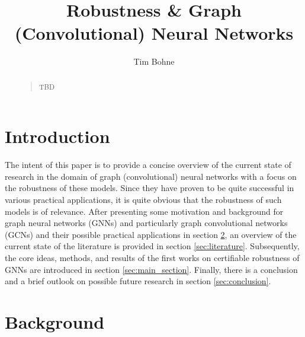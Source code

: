 \documentclass[a4paper,preprint]{sig-alternate}
\begin{document}
\title{Robustness \& Graph (Convolutional) Neural Networks}

%
\author{
%
\alignauthor Tim Bohne\\
}

\maketitle


\begin{abstract}
\begin{quote}
TBD
\end{quote}
\end{abstract}

\section{Introduction}

The intent of this paper is to provide a concise overview of the current state of research in the domain of graph (convolutional) neural networks
with a focus on the robustness of these models. Since they have proven to be quite successful in various practical applications, 
it is quite obvious that the robustness of such models is of relevance.
After presenting some motivation and background for graph neural networks (GNNs) and particularly graph convolutional networks (GCNs)
and their possible practical applications in section \ref{sec:background}, an overview of the current state of the literature is
provided in section \ref{sec:literature}. Subsequently, the core ideas, methods, and results of the first works on certifiable
robustness of GNNs are introduced in section \ref{sec:main_section}.
Finally, there is a conclusion and a brief outlook on possible future research in section \ref{sec:conclusion}.

\section{Background}
\label{sec:background}
\end{document}
